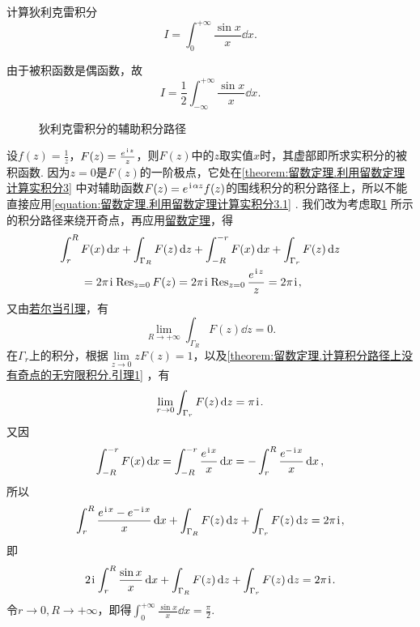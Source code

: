 \begin{example}
计算狄利克雷积分\[
I = \int_0^{+\infty} \frac{\sin x}{x} \dd{x}.
\]
\begin{solution}
由于被积函数是偶函数，故\[
I = \frac{1}{2} \int_{-\infty}^{+\infty} \frac{\sin x}{x} \dd{x}.
\]

\begin{figure}[ht]
\centering
{}
\caption{狄利克雷积分的辅助积分路径}
\label{figure:留数定理.狄利克雷积分的辅助积分路径}
\end{figure}

设\(f(z) = \frac{1}{z}\)，\(F(z) = \frac{e^{\kern1pt\mathrm{i}\kern1pt z}}{z}\)，则\(F(z)\)中的\(z\)取实值\(x\)时，其虚部即所求实积分的被积函数.
因为\(z=0\)是\(F(z)\)的一阶极点，它处在\cref{theorem:留数定理.利用留数定理计算实积分3} 中对辅助函数\(F(z) = e^{\kern1pt\mathrm{i}\kern1pt\alpha z} f(z)\)的围线积分的积分路径上，所以不能直接应用\cref{equation:留数定理.利用留数定理计算实积分3.1} .
我们改为考虑取\cref{figure:留数定理.狄利克雷积分的辅助积分路径} 所示的积分路径来绕开奇点，再应用\hyperref[theorem:留数定理.柯西留数定理]{留数定理}，得\[
\begin{split}
&\hspace{-20pt}\int_r^R F(x) \dd{x}
+ \int_{\Gamma_R} F(z) \dd{z}
+ \int_{-R}^{-r} F(x) \dd{x}
+ \int_{\Gamma_r} F(z) \dd{z} \\
&= 2\pi\iu \Res_{z=0} F(z)
= 2\pi\iu \Res_{z=0} \frac{e^{\iu z}}{z}
= 2\pi\iu,
\end{split}
\]又由\hyperref[theorem:留数定理.计算积分路径上没有奇点的无穷限积分.引理2]{若尔当引理}，有\[
\lim\limits_{R\to+\infty} \int_{\Gamma_R} F(z) \dd{z} = 0.
\]在\(\Gamma_r\)上的积分，根据\(\lim\limits_{z\to0} z F(z) = 1\)，以及\cref{theorem:留数定理.计算积分路径上没有奇点的无穷限积分.引理1} ，有\[
\lim\limits_{r\to0} \int_{\Gamma_r} F(z) \dd{z} = \pi\kern1pt\mathrm{i}\kern1pt.
\]又因\[
\int_{-R}^{-r} F(x) \dd{x}
= \int_{-R}^{-r} \frac{e^{\kern1pt\mathrm{i}\kern1pt x}}{x} \dd{x}
= -\int_r^R \frac{e^{-\kern1pt\mathrm{i}\kern1pt x}}{x} \dd{x},
\]所以\[
\int_r^R \frac{e^{\kern1pt\mathrm{i}\kern1pt x} - e^{-\kern1pt\mathrm{i}\kern1pt x}}{x} \dd{x}
+ \int_{\Gamma_R} F(z) \dd{z}
+ \int_{\Gamma_r} F(z) \dd{z}
= 2\pi\kern1pt\mathrm{i}\kern1pt,
\]即\[
2\kern1pt\mathrm{i}\kern1pt \int_r^R \frac{\sin x}{x} \dd{x}
+ \int_{\Gamma_R} F(z) \dd{z}
+ \int_{\Gamma_r} F(z) \dd{z}
= 2\pi\kern1pt\mathrm{i}\kern1pt.
\]令\(r\to0, R\to+\infty\)，即得\(\int_0^{+\infty} \frac{\sin x}{x} \dd{x} = \frac{\pi}{2}\).
\end{solution}
\end{example}

